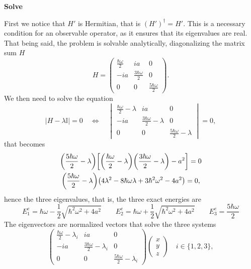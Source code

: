 \textbf{Solve}

First we notice that $H'$ is Hermitian, that is $(H')^{\dag} = H'$. This is a necessary condition for an observable operator, as it ensures that its eigenvalues are real. That being said, the problem is solvable analytically, diagonalizing the matrix sum $H$
\begin{equation}
    H =
    \begin{pmatrix}
        \frac{\hbar \omega}{2} & ia & 0 \\
        -ia & \frac{3 \hbar \omega}{2} & 0 \\
        0 & 0 & \frac{5 \hbar \omega}{2} 
    \end{pmatrix}.
\end{equation}
We then need to solve the equation
\begin{equation}
    \left| H - \lambda \mathbb{I} \right| = 0 \quad \Longleftrightarrow \quad
    \begin{vmatrix}
        \frac{\hbar \omega}{2} - \lambda & ia & 0 \\
        -ia & \frac{3 \hbar \omega}{2} - \lambda & 0 \\
        0 & 0 & \frac{5 \hbar \omega}{2} - \lambda
    \end{vmatrix} = 0,
\end{equation}
that becomes
\begin{gather}
        \biggl( \frac{5 \hbar \omega}{2} - \lambda \biggr) \biggl[  \biggl( \frac{\hbar \omega}{2} - \lambda \biggr) \biggl( \frac{3 \hbar \omega}{2} - \lambda \biggr) - a^2 \biggr] = 0 \notag \\
        \biggl( \frac{5 \hbar \omega}{2} - \lambda \biggr) \bigl( 4 \lambda^2 - 8 \hbar \omega \lambda + 3 \hbar^2 \omega^2 - 4 a^2 \bigr) = 0,
\end{gather}
hence the three eigenvalues, that is, the three exact energies are
\begin{equation}
    \label{eq: exact_energies}
    E_1^e = \hbar \omega - \frac{1}{2} \sqrt{\hbar^2 \omega^2 + 4 a^2} \qquad
    E_2^e = \hbar \omega + \frac{1}{2} \sqrt{\hbar^2 \omega^2 + 4 a^2} \qquad
    E_3^e = \frac{5 \hbar \omega}{2} 
\end{equation}
The eigenvectors are normalized vectors that solve the three systems
\begin{equation}
    \begin{pmatrix}
        \frac{\hbar \omega}{2} - \lambda_i & ia & 0 \\
        -ia & \frac{3 \hbar \omega}{2} - \lambda_i & 0 \\
        0 & 0 & \frac{5 \hbar \omega}{2} - \lambda_i
    \end{pmatrix}
    \begin{pmatrix}
        x \\
        y \\
        z
    \end{pmatrix} 
    \quad i \in \{ 1, 2, 3 \},
\end{equation}
